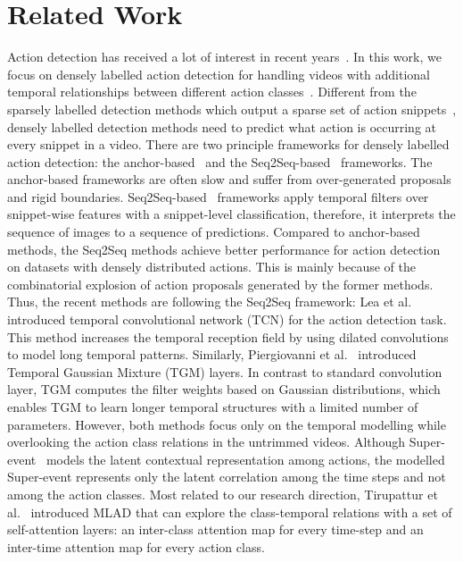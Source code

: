 \documentclass{bmvc2k}
\begin{document}
\section{Related Work}
Action detection has received a lot of interest in recent years~\cite{Dai_2021_ICCV,huang2020improving,dai2019self,superevent}. 
In this work, we focus on densely labelled action detection for handling videos with additional temporal relationships between different action classes~\cite{multi-thumos,charades,dai2020toyota}. Different from the sparsely labelled detection methods which output a sparse set of action snippets~\cite{caba2015activitynet,THUMOS14}, densely labelled detection methods need to predict what action is occurring at every snippet in a video. 
There are two principle frameworks for densely labelled action detection: the anchor-based~\cite{RC3d,AFNET} and the Seq2Seq-based~\cite{lea2017temporal,dai2019self} frameworks. 
The anchor-based frameworks are often slow and suffer from
over-generated proposals and rigid boundaries. 
Seq2Seq-based~\cite{TGM1} frameworks apply temporal filters over snippet-wise features with a snippet-level classification, therefore, it interprets the sequence of images to a sequence of predictions. 
Compared to anchor-based methods, the Seq2Seq methods achieve better performance for action detection on datasets with densely distributed actions. This is mainly because of the combinatorial explosion of action proposals generated by the former methods. Thus, the recent methods are following the Seq2Seq framework:
Lea et al.~\cite{lea2017temporal} introduced temporal convolutional network (TCN) for the action detection task. This method increases the temporal reception field by using dilated convolutions to model long temporal patterns.
Similarly, Piergiovanni et al.~\cite{TGM1} introduced Temporal Gaussian Mixture (TGM) layers. In contrast to standard convolution layer, TGM computes the filter weights based on Gaussian distributions, which enables TGM to learn longer temporal structures with a limited number of parameters. 
However, both methods focus only on the temporal modelling while overlooking the action class relations in the untrimmed videos. 
Although Super-event~\cite{superevent} models the 
latent contextual representation among actions, the modelled Super-event represents only the latent correlation among the time steps and not among the action classes. 
Most related to our research direction, Tirupattur et al.~\cite{MLAD} introduced MLAD that can explore the class-temporal relations with a set of self-attention layers: an inter-class attention map for every time-step and an inter-time attention map for every action class.   
\end{document}

